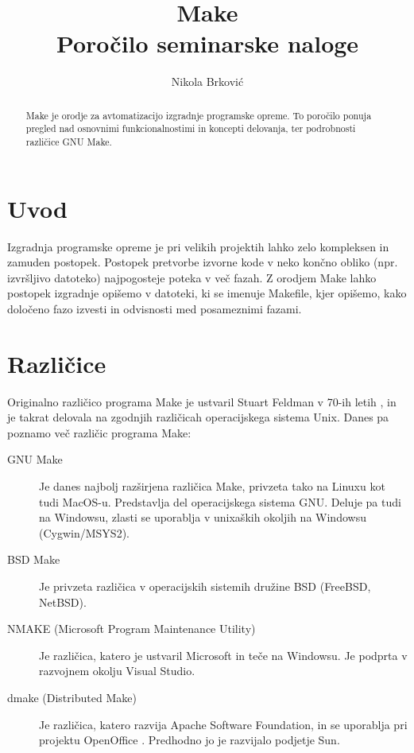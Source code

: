 \documentclass[notitlepage]{report}
\title{%
  Make \\
  \large Poročilo seminarske naloge
}
\author{Nikola Brković}
\begin{document}
\maketitle

\begin{abstract}
  Make je orodje za avtomatizacijo izgradnje programske opreme. To
  poročilo ponuja pregled nad osnovnimi funkcionalnostimi in koncepti
  delovanja, ter podrobnosti različice GNU Make.
\end{abstract}

\section*{Uvod}

Izgradnja programske opreme je pri velikih projektih lahko zelo
kompleksen in zamuden postopek. Postopek pretvorbe izvorne kode v neko
končno obliko (npr. izvršljivo datoteko) najpogosteje poteka v več
fazah. Z orodjem Make lahko postopek izgradnje opišemo v datoteki, ki
se imenuje Makefile, kjer opišemo, kako določeno fazo izvesti in
odvisnosti med posameznimi fazami.

\section*{Različice}

Originalno različico programa Make je ustvaril Stuart Feldman v 70-ih
letih \cite{acm-award}, in je takrat delovala na zgodnjih različicah
operacijskega sistema Unix. Danes pa poznamo več različic programa
Make:

\begin{description}
\item[GNU Make] Je danes najbolj razširjena različica Make, privzeta
  tako na Linuxu kot tudi MacOS-u. Predstavlja del operacijskega
  sistema GNU. Deluje pa tudi na Windowsu, zlasti se uporablja v
  unixaških okoljih na Windowsu (Cygwin/MSYS2).
  
\item[BSD Make] Je privzeta različica v operacijskih sistemih družine
  BSD (FreeBSD, NetBSD).

\item[NMAKE (Microsoft Program Maintenance Utility)] Je različica,
  katero je ustvaril Microsoft in teče na Windowsu. Je podprta v
  razvojnem okolju Visual Studio. \cite{ms-nmake}

\item[dmake (Distributed Make)] Je različica, katero razvija Apache Software Foundation,
  in se uporablja pri projektu OpenOffice \cite{dmake}. Predhodno jo je razvijalo
  podjetje Sun.
  
\end{description}
\end{document}
